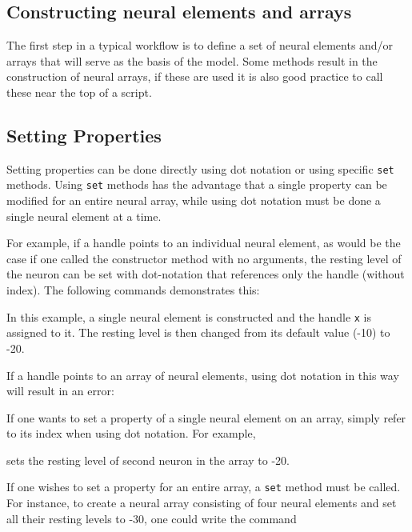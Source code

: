 \documentclass[phd, 12pt, doublespace, online]{fauthesis}
\begin{document}
\subsection{Constructing neural elements and arrays}

The first step in a typical workflow is to define a set of neural elements and/or arrays that will serve as the basis of the model. Some methods result in the construction of neural arrays, if these are used it is also good practice to call these near the top of a script. 

\subsection{Setting Properties}
Setting properties can be done directly using dot notation or using specific {\tt set} methods. Using {\tt set} methods has the advantage that a single property can be modified for an entire neural array, while using dot notation must be done a single neural element at a time. 

For example, if a handle points to an individual neural element, as would be the case if one called the constructor method with no arguments, the resting level of the neuron can be set with dot-notation that references only the handle (without index). The following commands demonstrates this:


\bigskip
{}


\bigskip
\noindent In this example, a single neural element is constructed and the handle {\tt x} is assigned to it. The resting level is then changed from its default value (-10) to -20. 

If a handle points to an array of neural elements, using dot notation in this way will result in an error:

\bigskip
{}

\bigskip
If one wants to set a property of a single neural element on an array, simply refer to its index when using dot notation. For example,

\bigskip
{}

\bigskip
\noindent sets the resting level of second neuron in the array to -20. 

\bigskip
If one wishes to set a property for an entire array, a {\tt set} method must be called. For instance, to create a neural array consisting of four neural elements and set all their resting levels to -30, one could write the command
\end{document}
